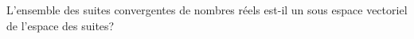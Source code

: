 L'ensemble des suites convergentes de nombres r{\'e}els est-il un sous espace vectoriel de l'espace des suites?
\bigskip